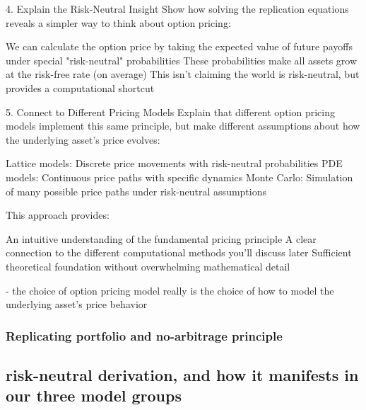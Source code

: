 \documentclass[english,12pt,a4paper,pdftex,sci,utf8]{aaltothesis}
\begin{document}
4. Explain the Risk-Neutral Insight
Show how solving the replication equations reveals a simpler way to think about option pricing:

We can calculate the option price by taking the expected value of future payoffs under special "risk-neutral" probabilities
These probabilities make all assets grow at the risk-free rate (on average)
This isn't claiming the world is risk-neutral, but provides a computational shortcut

5. Connect to Different Pricing Models
Explain that different option pricing models implement this same principle, but make different assumptions about how the underlying asset's price evolves:

Lattice models: Discrete price movements with risk-neutral probabilities
PDE models: Continuous price paths with specific dynamics
Monte Carlo: Simulation of many possible price paths under risk-neutral assumptions

This approach provides:

An intuitive understanding of the fundamental pricing principle
A clear connection to the different computational methods you'll discuss later
Sufficient theoretical foundation without overwhelming mathematical detail

- the choice of option pricing model really is the choice of how to model the underlying asset's price behavior
\subsubsection{Replicating portfolio and no-arbitrage principle}
\subsection{risk-neutral derivation, and how it manifests in our three model groups}
\end{document}
